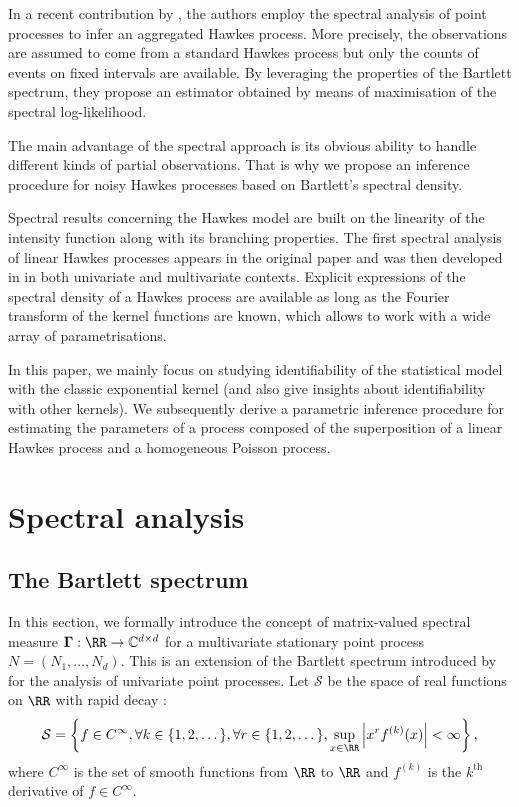        In a recent contribution by \textcite{Cheysson2022}, the authors employ the spectral analysis of point processes to infer an aggregated Hawkes process. More precisely, the observations are assumed to come from a standard Hawkes process but only the counts of events on fixed intervals are available.
        By leveraging the properties of the Bartlett spectrum, they propose an estimator obtained by means of maximisation of the spectral log-likelihood.

        The main advantage of the spectral approach is its obvious ability to handle different kinds of partial observations.
        That is why we propose an inference procedure for noisy Hawkes processes based on Bartlett's spectral density.
        
        Spectral results concerning the Hawkes model are built on the linearity of the intensity function along with its branching properties.
        The first spectral analysis of linear Hawkes processes appears in the original paper \textcite{Hawkes1971} and was then developed in \textcite{DaleyV1} in both univariate and multivariate contexts.
        Explicit expressions of the spectral density of a Hawkes process are available as long as the Fourier transform of the kernel functions are known, which allows to work with a wide array of parametrisations.

        In this paper, we mainly focus on studying identifiability of the statistical model with the classic exponential kernel
        (and also give insights about identifiability with other kernels).
        We subsequently derive a parametric inference procedure for estimating the parameters of a process composed of the superposition of a linear Hawkes process and a homogeneous Poisson process.

        
    \section{Spectral analysis}\label{sec:chap3_spectral_estimation}
      \subsection{The Bartlett spectrum}\label{sec:chap3_spectral_analysis}
        In this section, we formally introduce the concept of matrix-valued spectral measure
        $\mathbf \Gamma : \RR \to \mathbb C^{d \times d}$
        for a multivariate stationary point process $N = (N_1, \ldots, N_d)$.
        This is an extension of the Bartlett spectrum introduced by \textcite{Bartlett1963} for the analysis of univariate point processes.
        Let $\mathcal S$ be
        the space of real functions on $\RR$ with rapid decay \parencite[Chapter 8.6.1]{DaleyV1}:
        \[
          \mathcal S = \left\{ f \in C^\infty, \forall k \in \{1, 2, \dots\}, \forall r \in \{1, 2, \dots\},
          \sup_{x \in \RR} \left| x^r
          f^{(k)}(x)
          \right| < \infty \right\},
        \]
        where $C^\infty$ is the set of smooth functions from $\RR$ to $\RR$
        and $f^{(k)}$ is the \(k^\text{th}\) derivative of \(f \in C^\infty\).

